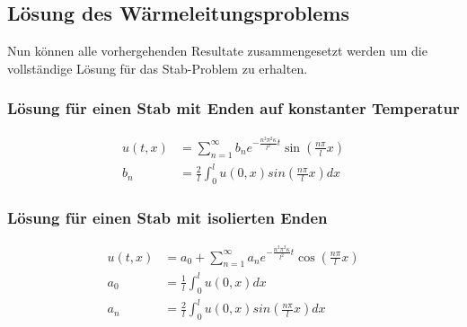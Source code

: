 \subsection{Lösung des Wärmeleitungsproblems}

Nun können alle vorhergehenden Resultate zusammengesetzt
werden um die vollständige Lösung für das Stab-Problem zu erhalten.

\subsubsection{Lösung für einen Stab mit Enden auf konstanter Temperatur}
\[
\begin{aligned}
    u(t,x)
    &=
    \sum_{n=1}^{\infty}b_{n}e^{-\frac{n^{2}\pi^{2}\kappa}{l^{2}}t}
    \sin\left(\frac{n\pi}{l}x\right)
    \\
    b_{n}
    &=
    \frac{2}{l}\int_{0}^{l}u(0,x)sin\left(\frac{n\pi}{l}x\right) dx
\end{aligned}
\]

\subsubsection{Lösung für einen Stab mit isolierten Enden}
\[
\begin{aligned}
    u(t,x)
    &=
    a_{0} + \sum_{n=1}^{\infty}a_{n}e^{-\frac{n^{2}\pi^{2}\kappa}{l^{2}}t}
    \cos\left(\frac{n\pi}{l}x\right)
    \\
    a_{0}
    &=
    \frac{1}{l}\int_{0}^{l}u(0,x) dx
    \\
    a_{n}
    &=
    \frac{2}{l}\int_{0}^{l}u(0,x)sin\left(\frac{n\pi}{l}x\right) dx
\end{aligned}
\]
